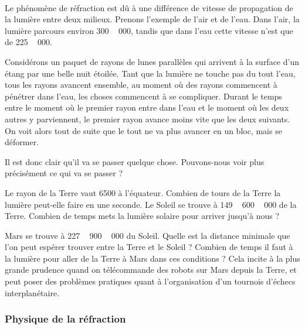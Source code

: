 \documentclass[a4paper,12pt]{book}
\newcommand{\pstTransHom}[5]{%
\pstTranslation{#1}{#2}{#3}[inter]
\pstHomO[HomCoef=#4]{#3}{inter}[#5]
}
\newcommand{\pstTangenteOPM}[5]{%
\pstMiddleAB{#1}{#3}{inter}
\pstInterCC{#1}{#2}{inter}{#3}{#4}{#5}
}
\newcommand{\pstDecompForce}[8]{%
  \psset{PointSymbol=none, PointName=none}
\pstTranslation{#3}{#4}{#1}[ibBu]
\pstTranslation{#5}{#6}{#1}[ibBd]

\pstTranslation{#3}{#4}{#2}[jbBu]
\pstTranslation{#5}{#6}{#2}[jbBd]

\pstInterLL{#2}{jbBd}{#1}{ibBu}{#7}
\pstInterLL{#2}{jbBu}{#1}{ibBd}{#8}
}
\newcommand{\pstDioptre}[8][Diinter]{%
  \psset{PointSymbol=none, PointName=none}
	\pstGeonode(#2){DiO}(#3){DiP}(#4){DiRi}
	\pstRotation[RotAngle=90]{DiO}{DiP}[DiQ]				%
   	\pstDecompForce{DiO}{DiRi}{DiO}{DiP}{DiO}{DiQ}{DiRix}{DiRiy}		%
  \FPeval{Dicoefrel}{#5/#6}
	\pstTransHom{DiRi}{DiRiy}{DiO}{\Dicoefrel}{DiRex}			%

   	\pstTranslation{DiO}{DiRex}{DiQ}[DiR]
   	\pstInterLC{DiRex}{DiR}{DiO}{DiRi}{#8}{#1}				%

	\pstTranslation{DiRi}{DiRiy}{DiRiy}[#7]					%
}
\theoremstyle{mes_exemples}	\newtheorem{exemple}[numtho]{Exemple}
\theoremstyle{mes_tho}
\begin{document}
\paragraph{}

Le phénomène de réfraction est dû à une différence de vitesse de propagation de la lumière entre deux milieux. Prenons l'exemple de l'air et de l'eau. Dans l'air, la lumière parcours environ \unit{300\,000}{\kilo\meter\per\second}, tandis que dans l'eau cette vitesse n'est que de \unit{225\,000}{\kilo\meter\per\second}. 

Considérons un paquet de rayons de lunes parallèles qui arrivent à la surface d'un étang par une belle nuit étoilée. Tant que la lumière ne touche pas du tout l'eau, tous les rayons avancent ensemble, au moment où des rayons commencent à pénétrer dans l'eau, les choses commencent à se compliquer. Durant le temps entre le moment où le premier rayon entre dans l'eau et le moment où les deux autres y parviennent, le premier rayon avance moins vite que les deux suivants. On voit alors tout de suite que le tout ne va plus avancer en un bloc, mais se déformer.

Il est donc clair qu'il va se passer quelque chose. Pouvons-nous voir plus précisément ce qui va se passer ?

\begin{exercice}
Le rayon de la Terre vaut \unit{6500}{\kilo\meter} à l'équateur. Combien de tours de la Terre la lumière peut-elle faire en une seconde. Le Soleil se trouve à \unit{149\,600\,000}{\kilo\meter} de la Terre. Combien de temps mets la lumière solaire pour arriver jusqu'à nous ? 

Mars se trouve à \unit{227\,900\,000}{\kilo\meter} du Soleil. Quelle est la distance minimale que l'on peut espérer trouver entre la Terre et le Soleil ? Combien de temps il faut à la lumière pour aller de la Terre à Mars dans ces conditions ? Cela incite à la plus grande prudence quand on télécommande des robots sur Mars depuis la Terre, et peut poser des problèmes pratiques quant à l'organisation d'un tournois d'échecs interplanétaire.
\end{exercice}

\subsubsection{Physique de la réfraction}

\newcommand{\prefigcalcrefr}{%
\pstGeonode(0,0){A}(2,0){B}			%
\pstHomO[HomCoef=-1]{A}{B}[B']			
\pstHomO[HomCoef=2]{A}{B}[A']
\pstRotation[RotAngle=-50]{A}{B'}[r1]		%
\pstTransHom{A}{r1}{B}{1}{r2}
\pstRotation[RotAngle=90]{A}{r1}[pl]
\pstInterLL{A}{pl}{B}{r2}{C}
\pstTransHom{C}{B}{A}{0.5}{Cl}			%
\pstInterLC{B'}{A'}{A}{Cl}{C1}{C2}
\pstTangenteOPM{A}{Cl}{B}{t2}{t1}
}
\end{document}
